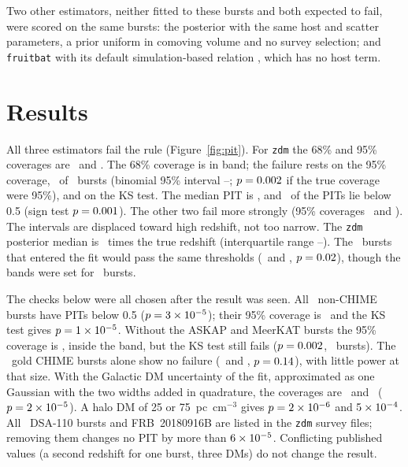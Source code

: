 \documentclass[twocolumn]{aastex631}
\newcommand{\code}[1]{\texttt{#1}}
\begin{document}
Two other estimators, neither fitted to these bursts and both expected to fail, were scored
on the same bursts: the \citet{macquart2020} posterior with the same host and scatter
parameters, a prior uniform in comoving volume and no survey selection; and \code{fruitbat}
\citep{batten2019} with its default simulation-based relation \citep{batten2021}, which has no
host term.

\section{Results}
\label{sec:results}
All three estimators fail the rule (Figure~\ref{fig:pit}). For \code{zdm} the 68\% and 95\%
coverages are \dmzRealEOneCovSixtyEight\ and \dmzRealEOneCovNinetyFive. The 68\% coverage is in
band; the failure rests on the 95\% coverage, \dmzRealCovNinetyFiveK\ of \dmzRealNCert\ bursts
(binomial 95\% interval \dmzRealCovNinetyFiveCiLo--\dmzRealCovNinetyFiveCiHi;
$p=0.002$ if the true coverage were 95\%), and on the KS test. The median PIT
is \dmzRealEOneMedPit, and \dmzRealEOneNBelowHalf\ of the PITs lie below 0.5 (sign test
$p=0.001$). The other two fail more strongly (95\% coverages
\dmzRealETwoCovNinetyFive\ and \dmzRealEThreeCovNinetyFive). The intervals are displaced toward high
redshift, not too narrow. The \code{zdm} posterior median is \dmzRealRatioMed\ times the true redshift (interquartile
range \dmzRealRatioIqrLo--\dmzRealRatioIqrHi). The \dmzRealInSampleN\ bursts that entered the fit
would pass the same thresholds (\dmzRealInSampleCovSixtyEight\ and
\dmzRealInSampleCovNinetyFive, $p=0.02$), though the bands were set for
\dmzSynN\ bursts.

The checks below were all chosen after the result was seen. All \dmzRealNonChimeN\ non-CHIME
bursts have PITs below 0.5 ($p=3\times10^{-5}$); their 95\% coverage is
\dmzRealNonChimeCovNinetyFive\ and the KS test gives $p=1\times10^{-5}$. Without the ASKAP and
MeerKAT bursts the 95\% coverage is \dmzRealChimeDsaCovNinetyFive, inside the band, but the KS
test still fails ($p=0.002$, \dmzRealChimeDsaN\ bursts). The \dmzRealGoldN\ gold
CHIME bursts alone show no failure (\dmzRealGoldCovSixtyEight\ and \dmzRealGoldCovNinetyFive,
$p=0.14$), with little power at that size. With the Galactic DM uncertainty of the fit, approximated as one Gaussian
with the two widths added in quadrature, the coverages are \dmzRealSigmaCovSixtyEight\ and \dmzRealSigmaCovNinetyFive\
($p=2\times10^{-5}$). A halo DM of 25 or 75~pc~cm$^{-3}$ gives $p=2\times10^{-6}$ and
$5\times10^{-4}$. All \dmzRealNDsa\ DSA-110 bursts and FRB~20180916B are listed in the
\code{zdm} survey files; removing them changes no PIT by more than $6\times10^{-5}$. Conflicting published values (a second
redshift for one burst, three DMs) do not change the result.
\end{document}
